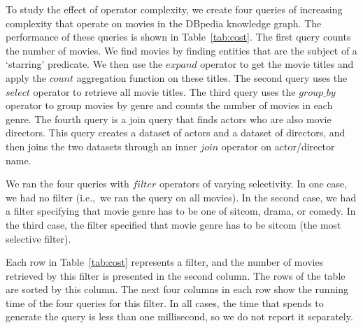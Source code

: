 To study the effect of operator complexity, we create four \rdfframes queries of increasing complexity that operate on movies in the DBpedia knowledge graph. 
The performance of these queries is shown in Table~\ref{tab:cost}.
The first query counts the number of movies. We find movies by finding entities that are the subject of a `starring' predicate. We then use the
$expand$ \rdfframes operator to get the movie titles and apply the $count$ aggregation function on these titles.
The second query uses the $select$ \rdfframes operator to retrieve all movie titles.
The third query uses the $group\_by$ operator to group movies by genre and counts the number of movies in each genre.
The fourth query is a join query that finds actors who are also movie directors. This query creates a dataset of actors and a dataset of directors, and then joins the two datasets through an inner $join$ operator on actor/director name.

We ran the four queries with $filter$ operators of varying selectivity.
In one case, we had no filter (i.e.,~we ran the query on all movies).
In the second case, we had a filter specifying that movie genre has to be one of sitcom, drama, or comedy.
In the third case, the filter specified that movie genre has to be sitcom (the most selective filter).

Each row in Table~\ref{tab:cost} represents a filter, and the number of movies retrieved by this filter is presented in the second column. The rows of the table are sorted by this column. The next four columns in each row show the running time of the four queries for this filter. In all cases, the time that \rdfframes spends to generate the \sparql query is less than one millisecond, so we do not report it separately.

